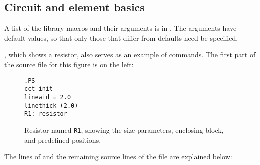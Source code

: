 \subsection{Circuit and element basics\label{Basics:}}
A list of the library macros and their arguments is in
.  The arguments have default values, so that only
those that differ from defaults need be specified.

, which shows a resistor, also serves as
an example of \pic commands.
The first part of the source file for this figure is 
on the left:

\begin{figure}[ht]
   \parbox{2in}{\tt .PS\\ \hbox{}\quad cct\_init\\ \hbox{}\quad linewid = 2.0\\ 
     \hbox{}\quad linethick\_(2.0)\\ R1: resistor}
   \raisebox{-0.3in}{\hbox{}}
   \caption{Resistor named {\tt R1}, showing the size parameters,
     enclosing block, and predefined positions.}
   \label{BigResistor}
   \end{figure}
The lines of 
and the remaining source lines of the file are explained below:
